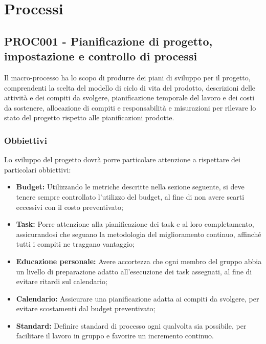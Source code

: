 \documentclass[NormeDiProgetto.tex]{subfiles}
\begin{document}
	\section{Processi}
	\subsection{PROC001 - Pianificazione di progetto, impostazione e controllo di processi}
	Il macro-processo ha lo scopo di produrre dei piani di sviluppo per il progetto, comprendenti la scelta del modello di ciclo di vita del prodotto, descrizioni delle attività e dei compiti da svolgere, pianificazione temporale del lavoro e dei costi da sostenere, allocazione di compiti e responsabilità e misurazioni per rilevare lo stato del progetto rispetto alle pianificazioni prodotte.
	
	\subsubsection{Obbiettivi}
	Lo sviluppo del progetto dovrà porre particolare attenzione a rispettare dei particolari obbiettivi:
	\begin{itemize}
		\item \textbf{Budget:} Utilizzando le metriche descritte nella sezione seguente, si deve tenere sempre controllato l'utilizzo del budget, al fine di non avere scarti eccessivi con il costo preventivato;
		\item \textbf{Task:} Porre attenzione alla pianificazione dei task e al loro completamento, assicurandosi che seguano la metodologia del miglioramento continuo, affinché tutti i compiti ne traggano vantaggio;
		\item \textbf{Educazione personale:} Avere accortezza che ogni membro del gruppo abbia un livello di preparazione adatto all'esecuzione dei task assegnati, al fine di evitare ritardi sul calendario;
		\item \textbf{Calendario:} Assicurare una pianificazione adatta ai compiti da svolgere, per evitare scostamenti dal budget preventivato;
		\item \textbf{Standard:} Definire standard di processo ogni qualvolta sia possibile, per facilitare il lavoro in gruppo e favorire un incremento continuo.
	\end{itemize}
	
\end{document}
